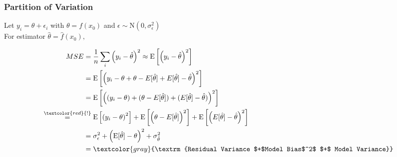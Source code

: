 \documentclass[xcolor={dvipsnames}]{beamer}
\begin{document}
\frame
{
\frametitle{Partition of Variation}

Let $y_i = \theta + \epsilon_i$ with $\theta = f(x_0)$ and $\epsilon \sim \textrm{N}(0,\sigma^2_\epsilon)$\\

For estimator $\hat \theta = \hat f(x_0),$

\begin{align*}
MSE ={}&  \frac{1}{n}\sum_i \left(y_i - \hat \theta \right)^2 \approx
\textrm{E}\left[\left(y_i - \hat \theta \right)^2\right] \\
={}&
\textrm{E}\left[\left(y_i - \theta + \theta - E[\hat \theta] + E[\hat \theta] - \hat \theta \right)^2\right] \\
={}&
\textrm{E}\left[\left((y_i - \theta) + (\theta - E[\hat \theta]) + (E[\hat \theta] - \hat  \theta )\right)^2\right] \\
\overset{\textcolor{red}{!}}{=}{}&
\textrm{E}\left[\left(y_i - \theta\right)^2\right] + \textrm{E}\left[\left(\theta - E[\hat \theta]\right)^2\right] + \textrm{E}\left[\left(E[\hat \theta] - \hat  \theta\right)^2\right] \\
={}&
\sigma^2_\epsilon  + \left(\textrm{E}{[}\hat \theta{]}-\theta\right)^2 + \sigma^2_{\hat \theta} \\
={}& \textcolor{gray}{\textrm{Residual Variance $+$Model Bias$^2$ $+$ Model Variance}} \\ \\
\end{align*}

}
\end{document}

